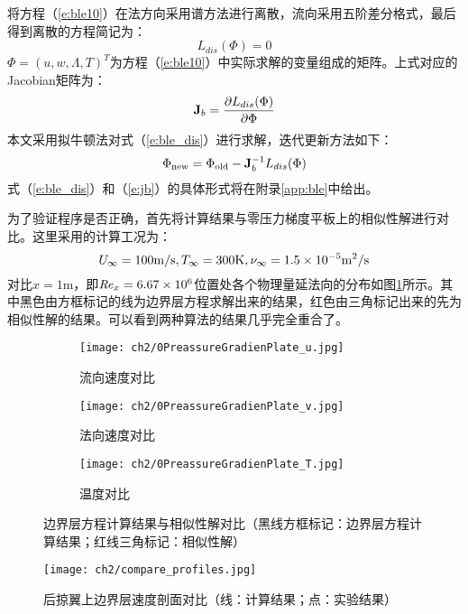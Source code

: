 将方程（\ref{e:ble10}）在法方向采用谱方法进行离散，流向采用五阶差分格式，最后得到离散的方程简记为：
\begin{equation}\label{e:ble_dis}
  L_{dis}(\Phi)=0
\end{equation}
$\Phi=(u,w,\Lambda,T)^T$为方程（\ref{e:ble10}）中实际求解的变量组成的矩阵。上式对应的Jacobian矩阵为：
\begin{equation}\label{e:jb}
  \mathbf{J}_b = \frac{\partial L_{dis}(\Phi)}{\partial \Phi}
\end{equation}
本文采用拟牛顿法对式（\ref{e:ble_dis}）进行求解，迭代更新方法如下：
\begin{equation}\label{e:ble_iter}
  \Phi_{\rm new} = \Phi_{\rm old} - \mathbf{J}_b^{-1}L_{dis}(\Phi)
\end{equation}
式（\ref{e:ble_dis}）和（\ref{e:jb}）的具体形式将在附录\ref{app:ble}中给出。

为了验证程序是否正确，首先将计算结果与零压力梯度平板上的相似性解进行对比。这里采用的计算工况为：
\begin{equation}
  U_\infty  = 100{\rm m/s},T_\infty  = 300{\rm K},\nu_\infty  = 1.5 \times 10^{ - 5} {\rm m^2 /s}
\end{equation}
对比$x=1$m，即$\mbox{{\textit{Re}}}_x=6.67\times10^6$位置处各个物理量延法向的分布如图\ref{f:0PreassureGradienPlate}所示。其中黑色由方框标记的线为边界层方程求解出来的结果，红色由三角标记出来的先为相似性解的结果。可以看到两种算法的结果几乎完全重合了。
\begin{figure}[htb]
  \centering%

  \begin{subfigure}{0.5\textwidth}
    \texttt{[image: ch2/0PreassureGradienPlate\_u.jpg]}
    \caption{流向速度对比}
  \end{subfigure}%
  \begin{subfigure}{0.5\textwidth}
    \texttt{[image: ch2/0PreassureGradienPlate\_v.jpg]}
    \caption{法向速度对比}
  \end{subfigure}%
  \bigskip

  \begin{subfigure}{0.5\textwidth}
    \texttt{[image: ch2/0PreassureGradienPlate\_T.jpg]}
    \caption{温度对比}
  \end{subfigure}%
  \caption{边界层方程计算结果与相似性解对比（黑线方框标记：边界层方程计算结果；红线三角标记：相似性解）}
  \label{f:0PreassureGradienPlate}
\end{figure}
\begin{figure}[htb]
  \centering
  \texttt{[image: ch2/compare\_profiles.jpg]}
  \caption{后掠翼上边界层速度剖面对比（线：计算结果；点：实验结果）}\label{f:ble_vs_exp}
\end{figure}

